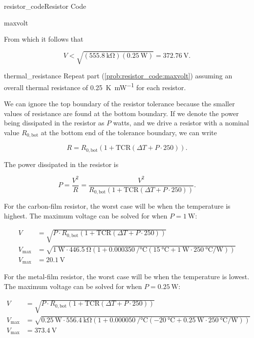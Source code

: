 \begin{mainquestion}{resistor_code}{Resistor Code}
\begin{partquestion}{maxvolt}
\begin{answer}
From which it follows that

\[
V
<
\sqrt{\left(\qty{555.8}{\kilo\ohm}\right)\left(\qty{0.25}{\watt}\right)}
=
\qty{372.76}{\volt}.
\]

\end{answer}
\end{partquestion}

\begin{partquestion}{thermal_resistance}
{Repeat part (\cref{prob:resistor_code:maxvolt}) assuming an overall thermal resistance of \qty{0.25}{\kelvin\per\milli\watt} for each resistor.}

\begin{answer}

We can ignore the top boundary of the resistor tolerance because the smaller values of resistance are found at the bottom boundary. If we denote the power being dissipated in the resistor as $P$ watts, and we drive a resistor with a nominal value $R_{0,\mathrm{bot}}$ at the bottom end of the tolerance boundary, we can write

\[
R
=
R_{0,\mathrm{bot}}
\left(
1+\mathrm{TCR}
\left(
\Delta T
+
P\cdot250
\right)
\right).
\]

The power dissipated in the resistor is

\[
P
=
\frac{V^2}{R}
=
\frac{V^2}
{R_{0,\mathrm{bot}}
\left(
1+\mathrm{TCR}
\left(
\Delta T
+
P\cdot250
\right)
\right)}.
\]

For the carbon-film resistor, the worst case will be when the temperature is highest. The maximum voltage can be solved for when $P=\qty{1}{\watt}$:

\def\power{\qty{1}{\watt}}
\begin{align*}
V &= \sqrt{P \cdot R_{0,\mathrm{bot}}\left(1+\mathrm{TCR}\left(\Delta T+P\cdot250\right)\right)} \\
V_{\text{max}} &= \sqrt{\power \cdot \qty{446.5}{\ohm}\left(1+\qty{0.000350}{\per\celsius}\left(\qty{15}{\celsius}+\power \cdot\qty{250}{\celsius\per\watt}\right)\right)} \\
V_{\text{max}} &= \qty{20.1}{\volt}
\end{align*}

For the metal-film resistor, the worst case will be when the temperature is lowest. The maximum voltage can be solved for when $P=\qty{0.25}{\watt}$:

\def\power{\qty{0.25}{\watt}}
\begin{align*}
V &= \sqrt{P \cdot R_{0,\mathrm{bot}}\left(1+\mathrm{TCR}\left(\Delta T+P\cdot250\right)\right)} \\
V_{\text{max}} &= \sqrt{\power \cdot \qty{556.4}{\kilo\ohm}\left(1+\qty{0.000050}{\per\celsius}\left(\qty{-20}{\celsius}+\power \cdot\qty{250}{\celsius\per\watt}\right)\right)} \\
V_{\text{max}} &= \qty{373.4}{\volt}
\end{align*}

\end{answer}
\end{partquestion}
\end{mainquestion}